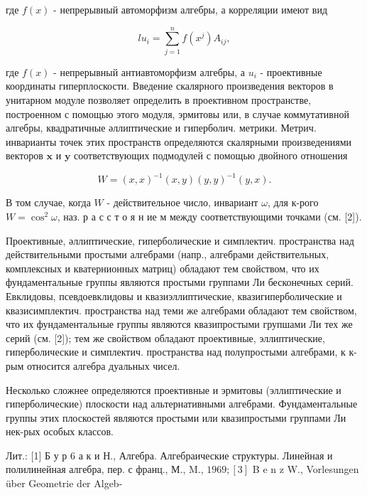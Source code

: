 \documentclass[10pt]{article}
\begin{document}
где $f(x)$ - непрерывный автоморфизм алгебры, а корреляции имеют вид



\[

l u_{i}=\sum_{j=1}^{n} f\left(x^{j}\right) A_{i j},

\]



где $f(x)$ - непрерывный антиавтоморфизм алгебры, а $u_{i}$ - проективные координаты гиперплоскости. Введение скалярного произведения векторов в унитарном модуле позволяет определить в проективном пространстве, построенном с помощью этого модуля, эрмитовы или, в случае коммутативной алгебры, квадратичные әллиптические и гиперболич. метрики. Метрич. инварианты точек этих пространств определяются скалярными произведениями векторов $\boldsymbol{x}$ и $\boldsymbol{y}$ соответствующих подмодулей с помощью двойного отношения



\[

W=(x, x)^{-1}(x, y)(y, y)^{-1}(y, x) .

\]



В том случае, когда $W$ - действительное число, инвариант $\omega$, для к-рого $W=\cos ^{2} \omega$, наз. р а с с т о я н ие м между соответствующими точками (см. [2]).



Проективные, әллиптические, гиперболические и симплектич. пространства над действительными простыми алгебрами (напр., алгебрами действительных, комплексных и кватернионных матриц) обладают тем свойством, что их фундаментальные группы являются простыми группами Ли бесконечных серий. Евклидовы, псевдоевклидовы и квазиэллиптические, квазигиперболические и квазисимплектич. пространства над теми же алгебрами обладают тем свойством, что их фундаментальные группы являются квазипростыми групшами Ли тех же серий (см. [2]); тем же свойством обладают проективные, эллиптические, гиперболические и симплектич. пространства над полупростыми алгебрами, к к-рым относится алгебра дуальных чисел.



Несколько сложнее определяются проективные и эрмитовы (эллиптические и гиперболические) плоскости над альтернативными алгебрами. Фундаментальные группы этих плоскостей являются простыми или квазипростыми группами Ли нек-рых особых классов.



Лит.: [1] Б у р 6 а к и Н., Алгебра. Алгебраические структуры. Линейная и полилинейная алгебра, пер. с франц., М., M., $1969 ;[3]$ B e n $\mathrm{z}$ W., Vorlesungen über Geometrie der Algeb-
\end{document}
